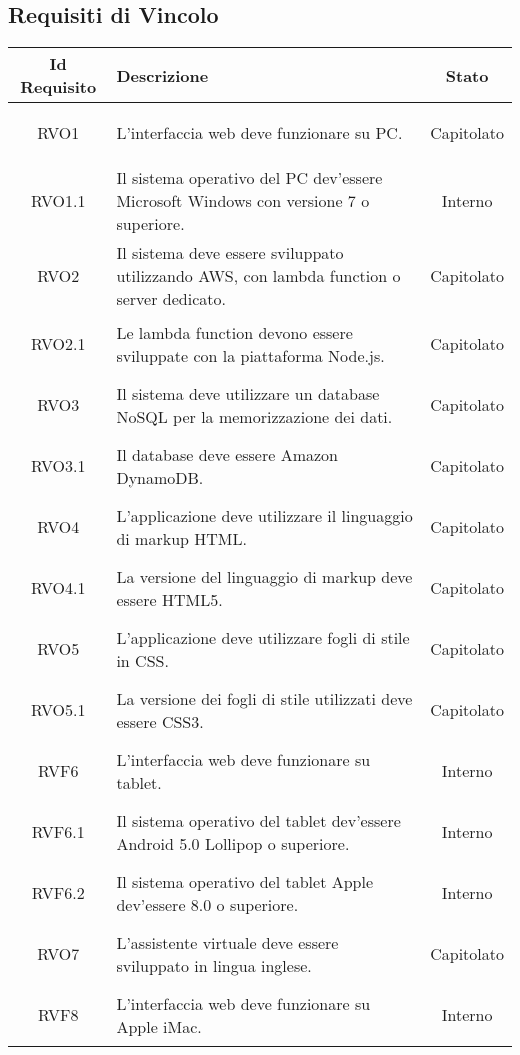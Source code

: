 \subsection{Requisiti di Vincolo}
\normalsize
\begin{longtable}{|c|>{\centering}m{7cm}|c|}
	\hline
	\textbf{Id Requisito} & \textbf{Descrizione} & \textbf{Stato}\\
	\hline
	\endhead\hypertarget{RVO1}{RVO1} & L'interfaccia web deve funzionare su PC. & Capitolato\\ \hline
	\hypertarget{RVO1.1}{RVO1.1} & Il sistema operativo del PC dev'essere Microsoft Windows con versione 7 o superiore. & Interno\\ \hline
	\hypertarget{RVO2}{RVO2} & Il sistema deve essere sviluppato utilizzando AWS, con lambda function o server dedicato. & Capitolato\\ \hline
	\hypertarget{RVO2.1}{RVO2.1} & Le lambda function devono essere sviluppate con la piattaforma Node.js. & Capitolato\\ \hline
	\hypertarget{RVO3}{RVO3} & Il sistema deve utilizzare un database NoSQL per la memorizzazione dei dati. & Capitolato\\ \hline
	\hypertarget{RVO3.1}{RVO3.1} & Il database deve essere Amazon DynamoDB. & Capitolato\\ \hline
	\hypertarget{RVO4}{RVO4} & L'applicazione deve utilizzare il linguaggio di markup HTML. & Capitolato\\ \hline
	\hypertarget{RVO4.1}{RVO4.1} & La versione del linguaggio di markup deve essere HTML5. & Capitolato\\ \hline
	\hypertarget{RVO5}{RVO5} & L’applicazione deve utilizzare fogli di stile in CSS. & Capitolato\\ \hline
	\hypertarget{RVO5.1}{RVO5.1} & La versione dei fogli di stile utilizzati deve essere CSS3. & Capitolato\\ \hline
	\hypertarget{RVF6}{RVF6} & L'interfaccia web deve funzionare su tablet. & Interno\\ \hline
	\hypertarget{RVF6.1}{RVF6.1} & Il sistema operativo del tablet dev'essere Android 5.0 Lollipop o superiore. & Interno\\ \hline
	\hypertarget{RVF6.2}{RVF6.2} & Il sistema operativo del tablet Apple dev'essere 8.0 o superiore. & Interno\\ \hline
	\hypertarget{RVO7}{RVO7} & L'assistente virtuale deve essere sviluppato in lingua inglese. & Capitolato\\ \hline
	\hypertarget{RVF8}{RVF8} & L'interfaccia web deve funzionare su Apple iMac. & Interno\\ \hline

\end{longtable}
